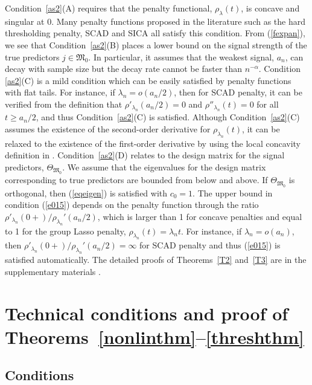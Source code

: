 \documentclass[aos,MSNbibl,dvips]{arximspdf}
\newcommand{\Mfrak}{\mathfrak{M}}
\begin{document}
\begin{appendix}
Condition~\ref{as2}(A) requires that the penalty functional, $\rho
_{\lambda}(t)$, is concave and singular at 0. Many penalty functions
proposed in the literature such as the hard thresholding penalty, SCAD
\cite{fan2} and SICA \cite{lv1} all satisfy this condition. From
(\ref{fexpan}), we see that Condition~\ref{as2}(B)
places a lower bound on the signal strength of the true predictors
$j\in\Mfrak_0$. In particular, it assumes that the weakest signal,
$a_n$, can decay with sample
size but the decay rate cannot be faster than $n^{-\alpha}$. Condition
\ref{as2}(C) is a mild condition which can be easily satisfied by
penalty functions with flat tails. For instance, if $\lambda_n =
o(a_n/2)$, then for SCAD penalty, it can be verified from the
definition that $\rho'_{\lambda_n}(a_n/2) = 0$ and $\rho''_{\lambda
_n}(t) = 0$ for all $t \geq a_n/2$, and thus\vspace*{1pt} Condition~\ref{as2}(C) is
satisfied. Although Condition~\ref{as2}(C) assumes the existence of
the second-order derivative for
$\rho_{\lambda_n}(t)$, it can be relaxed to the existence of the
first-order derivative by using the local concavity definition in \cite
{lv1}. Condition~\ref{as2}(D)
relates to the design matrix for the signal predictors, $\Theta
_{\Mfrak_0}$. We assume that the eigenvalues for the design matrix
corresponding to true predictors
are bounded from below and above. If $\Theta_{\Mfrak_0}$ is
orthogonal, then (\ref{eqeigen}) is satisfied with $c_0 = 1$. The
upper bound in condition (\ref{e015}) depends on the penalty function
through the ratio
$\rho'_{\lambda_n}(0+)/\rho_{\lambda_n}'(a_n/2)$, which is larger
than 1 for concave penalties and equal to 1 for the group Lasso penalty,
$\rho_{\lambda_n}(t)=\lambda_n t$. For instance, if $\lambda_n =
o(a_n)$, then $\rho'_{\lambda_n}(0+)/\rho_{\lambda_n}'(a_n/2) =
\infty$ for SCAD penalty and thus (\ref{e015}) is satisfied
automatically. The detailed proofs of Theorems~\ref{T2} and~\ref{T3}
are in the supplementary materials \cite{FAR}.

\section{Technical conditions and proof of Theorems~\texorpdfstring{\lowercase{\protect\ref{nonlinthm}}--\lowercase{\protect\ref{threshthm}}}{3--4}}
\label{appnonlimthm}

\subsection{Conditions}


\end{appendix}
\end{document}
